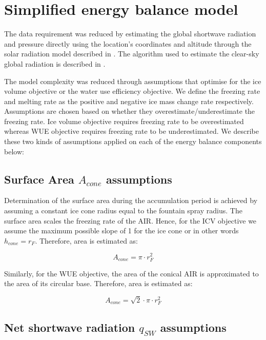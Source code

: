 \documentclass[tc, manuscript]{copernicus}
\begin{document}
\appendix

\section{Simplified energy balance model}


The data requirement was reduced by estimating the global shortwave radiation and pressure directly using the
location's coordinates and altitude through the solar radiation model described in
\citet{holmgrenPvlibPythonPython2018}. The algorithm used to estimate the clear-sky global radiation is
described in \citet{ineichenBroadbandSimplifiedVersion2008}.  

The model complexity was reduced through assumptions that optimise for the ice volume objective or the water use
efficiency objective. We define the freezing rate and melting rate as the positive and negative ice mass change
rate respectively. Assumptions are chosen based on whether they overestimate/underestimate the freezing rate.
Ice volume objective requires freezing rate to be overestimated whereas WUE objective requires freezing rate to
be underestimated. We describe these two kinds of assumptions applied on each of the energy balance components
below: 

\subsection{Surface Area $A_{cone}$ assumptions}

Determination of the surface area during the accumulation period is achieved by assuming a constant ice cone
radius equal to the fountain spray radius. The surface area scales the freezing rate of the AIR. Hence, for the
ICV objective we assume the maximum possible slope of 1 for the ice cone or in other words $h_{cone} = r_{F}$.
Therefore, area is estimated as:  

\begin{equation} A_{cone} =\pi \cdot r_{F}^2 \label{eq:Area} \end{equation}

Similarly, for the WUE objective, the area of the conical AIR is approximated to the area of its circular
base. Therefore, area is estimated as:

\begin{equation} A_{cone} =\sqrt{2} \cdot \pi \cdot r_{F}^2 \label{eq:Area} \end{equation}

\subsection{Net shortwave radiation \texorpdfstring{$q_{SW}$}{Lg} assumptions}
\label{sec:SW}
\end{document}
